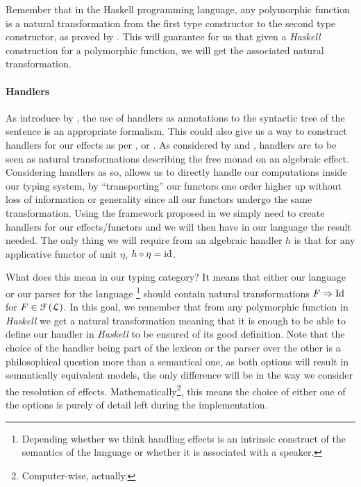 \medskip

Remember that in the Haskell programming language, any polymorphic function is
a natural transformation from the first type constructor to the second type
constructor, as proved by \cite{wadlerTheoremsFree1989}.
This will guarantee for us that given a \emph{Haskell} construction for a
polymorphic function, we will get the associated natural transformation.

\paragraph{Handlers}
\label{par:handlers}
As introduce by \cite{marsikAlgebraicEffectsHandlers}, the use of handlers
as annotations to the syntactic tree of the sentence is an appropriate
formalism.
This could also give us a way to construct handlers for our effects as per
\cite{bauerEffectSystemAlgebraic2014}, or
\cite{plotkinHandlingAlgebraicEffects2013}.
As considered by \cite{wuEffectHandlersScope2014} and
\cite{vandenbergFrameworkHigherorderEffects2024}, handlers are to be seen
as natural transformations describing the free monad on an algebraic effect.
Considering handlers as so, allows us to directly handle our computations
inside our typing system, by ``transporting'' our functors one order higher up
without loss of information or generality since all our functors undergo the
same transformation.
Using the framework proposed in \cite{vandenbergFrameworkHigherorderEffects2024}
we simply need to create handlers for our effects/functors and we will then
have in our language the result needed.
The only thing we will require from an algebraic handler $h$ is that for any
applicative functor of unit $\eta$, $h\circ \eta = \mathrm{id}$.

\medskip

What does this mean in our typing category?
It means that either our language or our parser for the language
\footnote{Depending whether we think handling effects is an intrinsic construct
	of the semantics of the language or whether it is associated with a speaker.}
should contain natural transformations $F \Rightarrow \mathrm{Id}$ for
$F \in \mathcal{F}\left( \mathcal{L} \right)$.
In this goal, we remember that from any polymorphic function in \emph{Haskell}
we get a natural transformation \cite{wadlerTheoremsFree1989} meaning that it
is enough to be able to define our handler in \emph{Haskell} to be ensured of
its good definition.
Note that the choice of the handler being part of the lexicon or the parser
over the other is a philosophical question more than a semantical one, as both
options will result in semantically equivalent models, the only difference will
be in the way we consider the resolution of effects.
Mathematically\footnote{Computer-wise, actually.}, this means the choice of
either one of the options is purely of detail left during the implementation.

